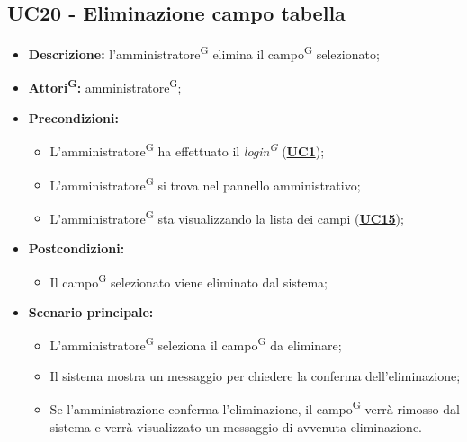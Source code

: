 \subsection{UC20 - Eliminazione campo tabella}
\label{sec:UC20}
\begin{itemize}
	\item \textbf{Descrizione:} l’amministratore\textsuperscript{G} elimina il campo\textsuperscript{G} selezionato;
	\item \textbf{Attori\textsuperscript{G}:} amministratore\textsuperscript{G};
	\item \textbf{Precondizioni:} 
	\begin{itemize}
		\item L’amministratore\textsuperscript{G} ha effettuato il \textit{login\textsuperscript{G}} (\hyperref[sec:UC1]{\textbf{UC1}});
		\item L’amministratore\textsuperscript{G} si trova nel pannello amministrativo;
		\item L’amministratore\textsuperscript{G} sta visualizzando la lista dei campi (\hyperref[sec:UC15]{\textbf{UC15}});
	\end{itemize}
	\item \textbf{Postcondizioni:} 
	\begin{itemize}
		\item Il campo\textsuperscript{G} selezionato viene eliminato dal sistema;
	\end{itemize}
	\item \textbf{Scenario principale:} 
	\begin{itemize}
		\item L'amministratore\textsuperscript{G} seleziona il campo\textsuperscript{G} da eliminare;
		\item Il sistema mostra un messaggio per chiedere la conferma dell'eliminazione;
		\item Se l'amministrazione conferma l'eliminazione, il campo\textsuperscript{G} verrà rimosso dal sistema e verrà visualizzato un messaggio di avvenuta eliminazione.
	\end{itemize}
\end{itemize}

